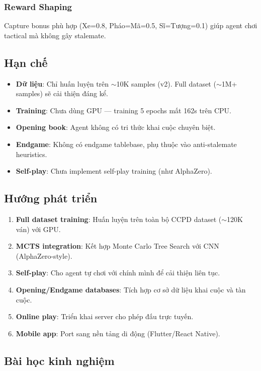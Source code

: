 \subsubsection{Reward Shaping}
Capture bonus phù hợp (Xe=0.8, Pháo=Mã=0.5, Sĩ=Tượng=0.1) giúp agent chơi tactical mà không gây stalemate.

\subsection{Hạn chế}

\begin{itemize}
    \item \textbf{Dữ liệu}: Chỉ huấn luyện trên $\sim$10K samples (v2). Full dataset ($\sim$1M+ samples) sẽ cải thiện đáng kể.
    \item \textbf{Training}: Chưa dùng GPU --- training 5 epochs mất 162s trên CPU.
    \item \textbf{Opening book}: Agent không có tri thức khai cuộc chuyên biệt.
    \item \textbf{Endgame}: Không có endgame tablebase, phụ thuộc vào anti-stalemate heuristics.
    \item \textbf{Self-play}: Chưa implement self-play training (như AlphaZero).
\end{itemize}

\subsection{Hướng phát triển}

\begin{enumerate}
    \item \textbf{Full dataset training}: Huấn luyện trên toàn bộ CCPD dataset ($\sim$120K ván) với GPU.
    \item \textbf{MCTS integration}: Kết hợp Monte Carlo Tree Search với CNN (AlphaZero-style).
    \item \textbf{Self-play}: Cho agent tự chơi với chính mình để cải thiện liên tục.
    \item \textbf{Opening/Endgame databases}: Tích hợp cơ sở dữ liệu khai cuộc và tàn cuộc.
    \item \textbf{Online play}: Triển khai server cho phép đấu trực tuyến.
    \item \textbf{Mobile app}: Port sang nền tảng di động (Flutter/React Native).
\end{enumerate}

\subsection{Bài học kinh nghiệm}

